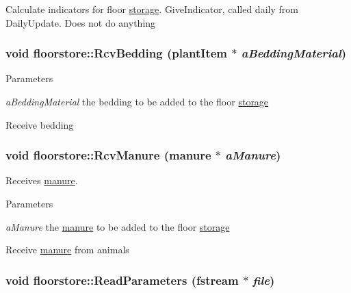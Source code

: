 Calculate indicators for floor \hyperlink{classstorage}{storage}. GiveIndicator, called daily from DailyUpdate. Does not do anything \hypertarget{classfloorstore_af2c0a2cfbe80ae99b8a25202f2d285b5}{
\subsubsection[{RcvBedding}]{\setlength{\rightskip}{0pt plus 5cm}void floorstore::RcvBedding ({\bf plantItem} $\ast$ {\em aBeddingMaterial})}}
\label{classfloorstore_af2c0a2cfbe80ae99b8a25202f2d285b5}

\begin{DoxyParams}{Parameters}
\item[{\em aBeddingMaterial}]the bedding to be added to the floor \hyperlink{classstorage}{storage}\end{DoxyParams}
Receive bedding \hypertarget{classfloorstore_a68ddc9791279945f7a42b3c643dd7e1c}{
\subsubsection[{RcvManure}]{\setlength{\rightskip}{0pt plus 5cm}void floorstore::RcvManure ({\bf manure} $\ast$ {\em aManure})}}
\label{classfloorstore_a68ddc9791279945f7a42b3c643dd7e1c}


Receives \hyperlink{classmanure}{manure}. 
\begin{DoxyParams}{Parameters}
\item[{\em aManure}]the \hyperlink{classmanure}{manure} to be added to the floor \hyperlink{classstorage}{storage}\end{DoxyParams}
Receive \hyperlink{classmanure}{manure} from animals \hypertarget{classfloorstore_ae1b9e00c23f4730f3f117a9e1000d2f6}{
\subsubsection[{ReadParameters}]{\setlength{\rightskip}{0pt plus 5cm}void floorstore::ReadParameters (fstream $\ast$ {\em file})}}
\label{classfloorstore_ae1b9e00c23f4730f3f117a9e1000d2f6}


